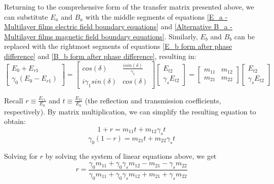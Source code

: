 Returning to the comprehensive form of the transfer matrix presented above, we can substitute $E_a$ and $B_a$ with the middle segments of equations \ref{E_a - Multilayer films electric field boundary equations} and \ref{Alternative B_a - Multilayer films magnetic field boundary equations}. Similarly, $E_b$ and $B_b$ can be replaced with the rightmost segments of equations \ref{E_b form after phase difference} and \ref{B_b form after phase difference}, resulting in: %
    \[
      \begin{bmatrix}
        E_0 + E_{r1}  \\
        \gamma_0(E_0 - E_{r1})
      \end{bmatrix} = 
            \begin{bmatrix}
            cos(\delta) & \frac{isin(\delta)}{\gamma_1} \\
            i\gamma_1sin(\delta) & cos(\delta)
            \end{bmatrix}
            \begin{bmatrix}
            E_{t2}  \\
            \gamma_sE_{t2}
          \end{bmatrix} =
                \begin{bmatrix}
                    m_{11} & m_{12} \\
                    m_{21} & m_{22}
                \end{bmatrix}
                \begin{bmatrix}
                    E_{t2} \\
                    \gamma_sE_{t2}
                  \end{bmatrix}
    \]

Recall $r \equiv \frac{E_{r1}}{E_0}$ and $t \equiv \frac{E_{t2}}{E_0}$ (the reflection and transmission coefficients, respectively). By matrix multiplication, we can simplify the resulting equation to obtain: %
    \begin{equation}
    1 + r = m_{11}t + m_{12}\gamma_st
    \end{equation}
    \begin{equation}
    \gamma_0(1 - r) = m_{21}t + m_{22}\gamma_st
    \end{equation}

Solving for $r$ by solving the system of linear equations above, we get
    \begin{equation}\label{reflection coefficient in terms of transfer matrix terms}
    r=\frac{\gamma_0m_{11} + \gamma_0\gamma_sm_{12} - m_{21} - \gamma_sm_{22}}{\gamma_0m_{11} + \gamma_0\gamma_sm_{12} + m_{21} + \gamma_sm_{22}}
    \end{equation}

